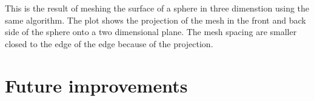 \documentclass[10pt,fleqn]{article}
\begin{document}
This is the result of meshing the surface of a sphere in three dimenstion using
the same algorithm. The plot shows the projection of the mesh in the front and
back side of the sphere onto a two dimensional plane. The mesh spacing are
smaller closed to the edge of the edge because of the projection.

\section{Future improvements}
\end{document}
